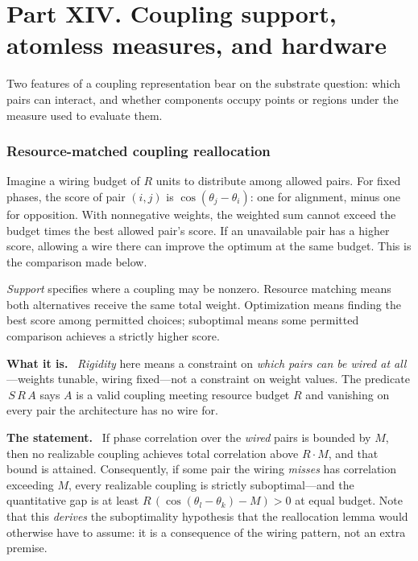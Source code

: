 \documentclass[11pt]{article}
\newcommand{\what}{\par\smallskip\noindent\textbf{What it is.}\ }
\newcommand{\statement}{\par\smallskip\noindent\textbf{The statement.}\ }
\newcommand{\id}[1]{{\small\ttfamily\seqsplit{#1}}}
\begin{document}
\part*{Part XIV. Coupling support, atomless measures, and hardware}

Two features of a coupling representation bear on the substrate question:
which pairs can interact, and whether components occupy points or regions
under the measure used to evaluate them.

\section{Resource-matched coupling reallocation}

Imagine a wiring budget of $R$ units to distribute among allowed pairs.
For fixed phases, the score of pair $(i,j)$ is $\cos(\theta_j-\theta_i)$:
one for alignment, minus one for opposition. With nonnegative weights, the
weighted sum cannot exceed the budget times the best allowed pair's score.
If an unavailable pair has a higher score, allowing a wire there can improve
the optimum at the same budget. This is the comparison made below.

\emph{Support} specifies where a coupling may be nonzero. Resource matching
means both alternatives receive the same total weight. Optimization means
finding the best score among permitted choices; suboptimal means some
permitted comparison achieves a strictly higher score.

\what
\emph{Rigidity} here means a constraint on \emph{which pairs can be wired at
all}---weights tunable, wiring fixed---not a constraint on weight values. The
predicate \id{RealizableIn}\,$S\,R\,A$ says $A$ is a valid coupling meeting
resource budget $R$ and vanishing on every pair the architecture has no wire
for.

\statement
If phase correlation over the \emph{wired} pairs is bounded by $M$, then no
realizable coupling achieves total correlation above $R\cdot M$, and that bound
is attained. Consequently, if some pair the wiring \emph{misses} has
correlation exceeding $M$, every realizable coupling is strictly
suboptimal---and the quantitative gap is at least
$R\,(\cos(\theta_l-\theta_k)-M)>0$ at equal budget. Note that this
\emph{derives} the suboptimality hypothesis that the reallocation lemma would
otherwise have to assume: it is a consequence of the wiring pattern, not an
extra premise.
\end{document}
